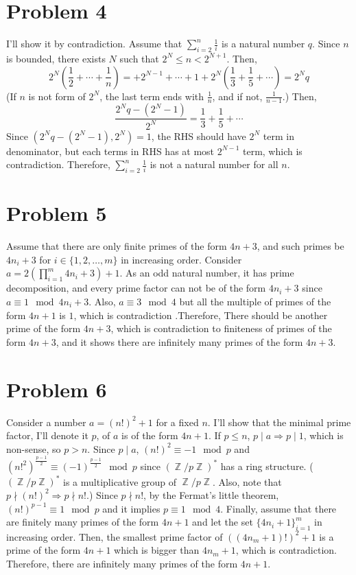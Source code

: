 \documentclass{article}
\DeclareMathOperator{\zz}{\mathbb{Z}}
\begin{document}
\section*{Problem 4}
I'll show it by contradiction. Assume that $\sum\limits_{i=2}^n \frac{1}{i}$ is a natural number $q$. Since $n$ is bounded, there exists $N$ such that $2^N\leq n < 2^{N+1}$. Then,
\begin{equation*}
2^N\left(\frac{1}{2}+\cdots +\frac{1}{n}\right)=+2^{N-1}+\cdots+1+2^N\left(\frac{1}{3}+\frac{1}{5}+\cdots\right)=2^N q
\end{equation*}
(If $n$ is not form of $2^N$, the last term ends with $\frac{1}{n}$, and if not, $\frac{1}{n-1}$.)
Then,
\begin{equation*}
\frac{2^N q-(2^{N}-1)}{2^N}=\frac{1}{3}+\frac{1}{5}+\cdots
\end{equation*}
Since $(2^N q-(2^{N}-1), 2^N)=1$, the RHS should have $2^N$ term in denominator, but each terms in RHS has at most $2^{N-1}$ term, which is contradiction. Therefore, $\sum\limits_{i=2}^n \frac{1}{i}$ is not a natural number for all $n$.

\section*{Problem 5}
Assume that there are only finite primes of the form $4n+3$, and such primes be $4n_i+3$ for $i\in \{1, 2, \ldots, m\}$ in increasing order. Consider $a=2\left(\prod_{i=1}^m 4n_i+3\right)+1$. As an odd natural number, it has prime decomposition, and every prime factor can not be of the form $4n_i+3$ since $a \equiv 1\mod 4n_i+3$. Also, $a \equiv 3\mod 4$ but all the multiple of primes of the form $4n+1$ is $1$, which is contradiction .Therefore, There should be another prime of the form $4n+3$, which is contradiction to finiteness of primes of the form $4n+3$, and it shows there are infinitely many primes of the form $4n+3$.

\section*{Problem 6}
Consider a number $a=(n!)^2+1$ for a fixed $n$. I'll show that the minimal prime factor, I'll denote it $p$, of $a$ is of the form $4n+1$. If $p\leq n$, $p\mid a\Rightarrow p\mid 1$, which is non-sense, so $p>n$. Since $p\mid a$, $(n!)^2\equiv -1\mod p$ and $(n!^2)^{\frac{p-1}{2}}\equiv (-1)^{\frac{p-1}{2}} \mod p$ since $(\zz/p\zz)^*$ has a ring structure. ($(\zz/p\zz)^*$ is a multiplicative group of $\zz/p\zz$. Also, note that $p\nmid (n!)^2\Rightarrow p\nmid n!$.) Since $p\nmid n!$, by the Fermat's little theorem, $(n!)^{p-1}\equiv 1 \mod p$ and it implies $p \equiv 1 \mod 4$.
Finally, assume that there are finitely many primes of the form $4n+1$ and let the set $\{4n_i+1\}_{i=1}^m$ in increasing order. Then, the smallest prime factor of $((4n_m+1)!)^2+1$ is a prime of the form $4n+1$ which is bigger than $4n_m+1$, which is contradiction. Therefore, there are infinitely many primes of the form $4n+1$.
\end{document}

